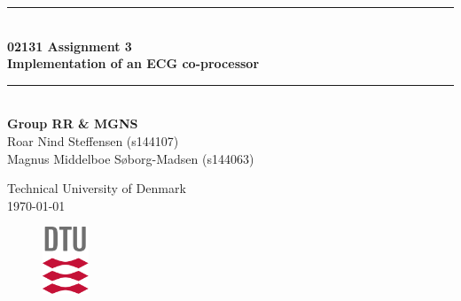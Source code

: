 \begin{titlepage}
\centering
\parindent=0pt
\newcommand{\HRule}{\rule{\textwidth}{1mm}}
 \HRule\\[1cm]\huge\textbf
{02131 Assignment 3 \\Implementation of an ECG co-processor}\\[0.1cm]
\HRule\\[3cm]\vspace{-1 cm} \textbf{\Large{Group RR \& MGNS}}\\
\large{
Roar Nind Steffensen (s144107)\\
Magnus Middelboe Søborg-Madsen (s144063)}

\vspace{2 cm}

\vspace{0.5cm}
\begin{figure}[H]
\centering
\label{fig:front}
\end{figure}

 \normalsize %
Technical University of Denmark\\
\today
\begin{figure}[h]
    \centering
    \includegraphics[height=2cm]{frontpage/DTUlogo.png}
\end{figure}
\end{titlepage}